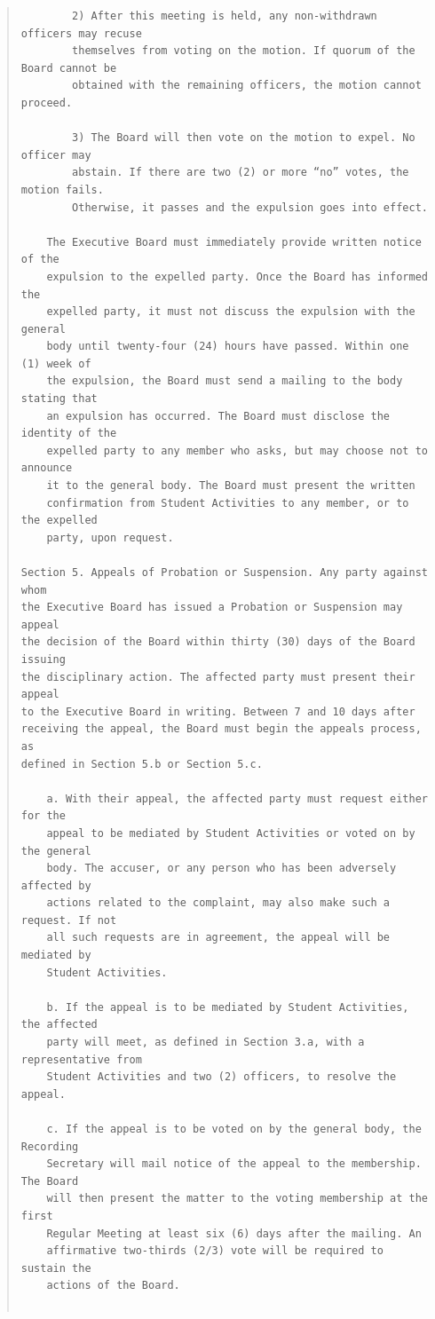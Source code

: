 \documentclass{article}
\begin{document}
\begin{quote}
\begin{verbatim}
        2) After this meeting is held, any non-withdrawn officers may recuse
        themselves from voting on the motion. If quorum of the Board cannot be
        obtained with the remaining officers, the motion cannot proceed.

        3) The Board will then vote on the motion to expel. No officer may
        abstain. If there are two (2) or more “no” votes, the motion fails.
        Otherwise, it passes and the expulsion goes into effect.

    The Executive Board must immediately provide written notice of the
    expulsion to the expelled party. Once the Board has informed the
    expelled party, it must not discuss the expulsion with the general
    body until twenty-four (24) hours have passed. Within one (1) week of
    the expulsion, the Board must send a mailing to the body stating that
    an expulsion has occurred. The Board must disclose the identity of the
    expelled party to any member who asks, but may choose not to announce
    it to the general body. The Board must present the written
    confirmation from Student Activities to any member, or to the expelled
    party, upon request.

Section 5. Appeals of Probation or Suspension. Any party against whom
the Executive Board has issued a Probation or Suspension may appeal
the decision of the Board within thirty (30) days of the Board issuing
the disciplinary action. The affected party must present their appeal
to the Executive Board in writing. Between 7 and 10 days after
receiving the appeal, the Board must begin the appeals process, as
defined in Section 5.b or Section 5.c.

    a. With their appeal, the affected party must request either for the
    appeal to be mediated by Student Activities or voted on by the general
    body. The accuser, or any person who has been adversely affected by
    actions related to the complaint, may also make such a request. If not
    all such requests are in agreement, the appeal will be mediated by
    Student Activities.

    b. If the appeal is to be mediated by Student Activities, the affected
    party will meet, as defined in Section 3.a, with a representative from
    Student Activities and two (2) officers, to resolve the appeal.

    c. If the appeal is to be voted on by the general body, the Recording
    Secretary will mail notice of the appeal to the membership. The Board
    will then present the matter to the voting membership at the first
    Regular Meeting at least six (6) days after the mailing. An
    affirmative two-thirds (2/3) vote will be required to sustain the
    actions of the Board.


\end{verbatim}
\end{quote}
\end{document}
